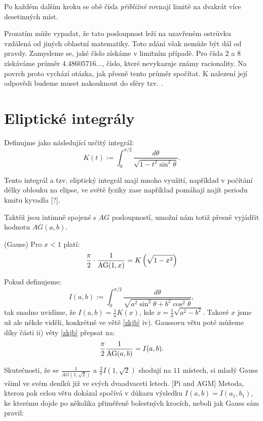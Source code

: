 \documentclass[12pt]{report}
\begin{document}
Po každém dalším kroku se obě čísla \textit{přibližně} rovnají limitě na dvakrát více desetinných míst.

Prozatím může vypadat, že tato posloupnost leží na uzavřeném ostrůvku vzdálená od jiných oblastní matematiky. Toto zdání však nemůže být dál od pravdy. Zamysleme se, jaké číslo získáme v limitním případě. Pro čísla $2$ a $8$ získáváme průměr $4.48605716\dots$, číslo, které nevykazuje známy racionality. Na povrch proto vychází otázka, jak přesně tento průměr spočítat. K nalezení její odpovědi budeme muset nakouknout do sféry tzv. .
\section{Eliptické integrály}

\begin{definice}
Definujme  jako následující určitý integrál:
\begin{equation*}
K(t) := \int_{0}^{\pi/2} \frac{d \theta}{\sqrt{1 - t^2 \sin^2 \theta}}.
\end{equation*}
\end{definice}

Tento integrál a tzv. eliptický integrál  mají mnoho využití, například v počítání délky oblouku na elipse, ve světě fyziky zase například pomáhají najít periodu kmitu kyvadla [?].

Taktéž jsou intimně spojené s $AG$ posloupností, umožní nám totiž přesně vyjádřit hodnotu $AG(a,b)$.
\begin{veta} (Gauss)
Pro $x<1$ platí:
$$\frac{\pi}{2} \cdot \frac{1}{\operatorname{AG}(1,x)} = K\left(\sqrt{1 - x^2}\right)$$
\end{veta}

Pokud definujeme:
$$I(a,b) := \int_{0}^{\pi/2} \frac{d \theta}{\sqrt{a^2 \sin ^2 \theta + b^2 \cos ^2 \theta}}, $$
tak snadno uvidíme, že $I(a,b) = \frac{1}{a} K(x)$, kde $x =\frac{1}{a} \sqrt{a^2-b^2}$. Takové $x$ jsme už ale někde viděli, konkrétně ve větě \ref{zkjb} iv). Gaussovu větu poté můžeme díky části ii) věty \ref{zkjb} přepsat na:
$$\frac{\pi}{2} \frac{1}{\operatorname{AG}(a,b)} = I(a,b).$$

 Skutečnosti, že se $\frac{1}{AG(1,\sqrt{2})}$ a $\frac{2}{\pi} I(1,\sqrt{2})$ shodují na $11$ místech, si mladý Gauss všiml ve svém deníků již ve svých dvaadvaceti letech. [Pi and AGM] Metoda, kterou pak celou větu dokázal spočívá v důkazu výsledku $I(a,b) = I(a_1,b_1)$, ke kterému dojde po několika přiměřeně bolestných krocích, neboli jak Gauss sám pravil:
\end{document}

